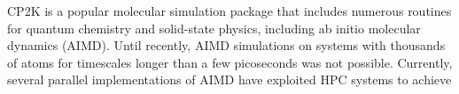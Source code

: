 CP2K \cite{hutter2014cp2k} is a popular molecular simulation package that includes numerous routines for quantum chemistry and solid-state physics, including ab initio molecular dynamics (AIMD). Until recently, AIMD simulations on systems with thousands of atoms for timescales longer than a few picoseconds was not possible. Currently, several parallel implementations of AIMD have exploited HPC systems to achieve 